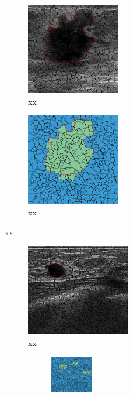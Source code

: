 \begin{figure}[h]
  \centering
  \begin{subfigure}[b]{0.42\textwidth}
      \begin{subfigure}[b]{0.45\textwidth}
          \includegraphics[trim= 20 0 30 0, clip, height=4cm]{goodQSorigin}
          \caption{xx}
      \end{subfigure}
      \hfill
      \begin{subfigure}[b]{0.45\textwidth}
        \includegraphics[trim= 20 0 30 0, clip, height=4cm]{goodQSseg}
        \caption{xx}
        \label{fig:results:perfect}
      \end{subfigure}
    \end{subfigure}
    \hfill
    \begin{subfigure}[b]{0.55\textwidth}
      \begin{subfigure}[b]{0.60\textwidth}
          \includegraphics[trim = 0 90 0 0, clip, height=4cm]{fporigin}
          \caption{xx}
      \end{subfigure}
      \hfill
      \begin{subfigure}[b]{0.3\textwidth}
        \begin{subfigure}[b]{\textwidth}
          \includegraphics[trim = 0 90 0 0, clip, height=1.6cm]{fpnohom}

\end{subfigure}
\end{subfigure}
\end{subfigure}
\end{figure}
